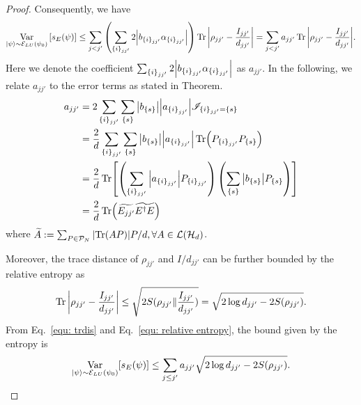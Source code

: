 \documentclass[showpacs,amsmath,amssymb,twocolumn,aps,pra,superscriptaddress,notitlepage,10pt]{revtex4-2}
\newcommand{\cP}{\mathcal P}
\newcommand{\cE}{\mathcal E_{LU}}
\newcommand{\kp}{\ket{\psi}}
\begin{document}
\begin{proof}
    Consequently, we have
    \begin{align}\label{equ: trdis}
        \mathop{\mathrm{Var}}_{\kp\sim\cE(\psi_0)}{[s_E(\psi)]}\le\sum_{j<j'}\left(\sum_{\{i\}_{jj'}}2\abs{b_{\{i\}_{jj'}}\alpha_{\{i\}_{jj'}}}\right)\Tr\abs{\rho_{jj'}-\frac{I_{jj'}}{d_{jj'}}}=\sum_{j<j'}a_{jj'}\Tr\abs{\rho_{jj'}-\frac{I_{jj'}}{d_{jj'}}}.
    \end{align}
    Here we denote the coefficient $\sum_{\{i\}_{jj'}}2\abs{b_{\{i\}_{jj'}}\alpha_{\{i\}_{jj'}}}$ as $a_{jj'}$. In the following, we relate $a_{jj'}$ to the error terms as stated in Theorem.
    \begin{equation}
        \begin{aligned}
            a_{jj'}&=2\sum_{\{i\}_{jj'}}\sum_{\{s\}}\abs{b_{\{s\}}}\abs{a_{{\{i\}}_{jj'}}}\mathscr{I}_{\{i\}_{jj'}=\{s\}}\\
            &=\frac{2}{d}\sum_{\{i\}_{jj'}}\sum_{\{s\}}\abs{b_{\{s\}}}\abs{a_{\{i\}_{jj'}}}\Tr(P_{\{i\}_{jj'}}P_{\{s\}})\\
            &=\frac{2}{d}\Tr[\left(\sum_{\{i\}_{jj'}}\abs{a_{\{i\}_{jj'}}}P_{\{i\}_{jj'}}\right)\left(\sum_{\{s\}}\abs{b_{\{s\}}}P_{\{s\}}\right)]\\
            &=\frac{2}{d}\Tr(\widetilde{E_{jj'}}\widetilde{E^\dagger E})
        \end{aligned}
    \end{equation}
    where $\widetilde A:=\sum_{P\in\cP_N}\abs{\Tr(AP)}P/d, \forall A\in\mathcal L(\mathcal H_d)$.

    Moreover, the trace distance of $\rho_{jj'}$ and $I/d_{jj'}$ can be further bounded by the relative entropy as
    \begin{align}
        \Tr\left|\rho_{jj'}-\frac{I_{jj'}}{d_{jj'}}\right|\leq\sqrt{2S(\rho_{jj'}\|\frac{I_{jj'}}{d_{jj'}})}=\sqrt{2\log{d_{jj'}}-2S(\rho_{jj'})}\label{equ: relative entropy}.
    \end{align}
    From Eq.~\eqref{equ: trdis} and Eq.~\eqref{equ: relative entropy}, the bound given by the entropy is
    \begin{equation}
        \mathop{\mathrm{Var}}_{\ket{\psi}\sim\cE(\psi_0)}[s_E(\psi)]\leq \sum_{j\le j'}a_{jj'}\sqrt{2\log{d_{jj'}}-2S(\rho_{jj'})}.
    \end{equation}
\end{proof}
\end{document}

